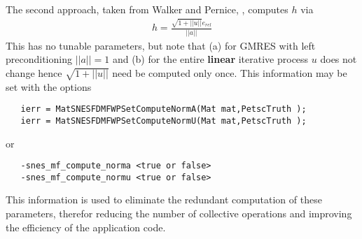 The second approach, taken from Walker and Pernice, \cite{?}, computes $ h $ via
\begin{eqnarray*}
        h = \frac{\sqrt{1 + ||u||}e_{rel}}{||a||}
\end{eqnarray*}
This has no tunable parameters, but note that (a) for GMRES with left preconditioning
$ ||a|| = 1 $ and (b) for the entire {\bf linear} iterative process $ u $ does not change hence
$\sqrt{1 + ||u||} $ need be computed only once. This information may be set with the 
options
\begin{verbatim}
   ierr = MatSNESFDMFWPSetComputeNormA(Mat mat,PetscTruth );
   ierr = MatSNESFDMFWPSetComputeNormU(Mat mat,PetscTruth );
\end{verbatim}
or 
\begin{verbatim}
   -snes_mf_compute_norma <true or false>
   -snes_mf_compute_normu <true or false>
\end{verbatim}
This information is used to eliminate the redundant computation of these parameters,
therefor reducing the number of collective operations and improving the efficiency of the 
application code.

